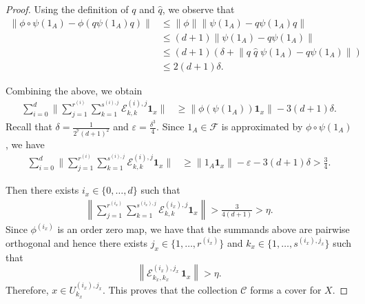\documentclass[a4paper]{amsart}
\numberwithin{equation}{section}
\newcommand{\Ecal}{\mathcal{E}}
\newcommand{\Fcal}{\mathcal{F}}
\newcommand{\e}{\varepsilon}
\newcommand{\indF}{\mathbf{1}}
\newcommand{\norm}[1]{{\left\lVert #1 \right \rVert}}
\newcommand{\normBig}[1]{{\Big\lVert #1 \Big \rVert}}
\newcommand{\unMatImg}[3]{{\Ecal_{#3}^{(#1), #2}}}
\theoremstyle{plain}
\theoremstyle{indented}
\numberwithin{equation}{section}
\theoremstyle{definition}
\theoremstyle{remark}
\theoremstyle{plain}
\theoremstyle{definition}
\begin{document}
\begin{proof}
       Using the definition of $q$ and $\widehat{q}$, we observe that
        \begin{align*}
            \norm{\phi \circ \psi (1_A) - \phi (q \psi (1_A) q) } 
           & \le \norm{\phi}\norm{ \psi (1_A) - q  \psi (1_A) q }  \\
           & \le (d+1) \norm{ \psi (1_A) - q  \psi (1_A)} \\
            & \le (d+1) ( \delta
            + \norm{ q \; \widehat{q}\;  \psi (1_A) - 
            q \psi (1_A)})  \\
            & \le 2(d+1) \delta.
        \end{align*}
         
        Combining the above, we obtain
        \begin{align*}
           \sum_{i=0}^d \Big\lVert \sum_{j =1 }^{r^{(i)}} \sum_{k =1 }^{s^{(i),j}}
             \unMatImg{i}{j}{k,k} \indF_x \Big\rVert
             & \ge  \normBig{ \phi \left( \psi(1_A) \right)\indF_x } - 3(d+1) \delta .
        \end{align*}
         Recall that 
         ${\delta = \frac{1}{2^7 (d+1)^2}}$ and  ${\e = \frac{\delta^3}{4}}$. 
         Since ${1_A\in \Fcal}$ is approximated by ${\phi \circ \psi (1_A)}$, we have
         \begin{align*}
           \sum_{i=0}^d \Big\lVert \sum_{j =1 }^{r^{(i)}} \sum_{k =1 }^{s^{(i),j}}
             \unMatImg{i}{j}{k,k} \indF_x \Big\rVert
             & \ge  \normBig{ 1_A\indF_x } - \e - 3(d+1) \delta  
              > \frac{3}{4}.
        \end{align*}
              
        Then there exists ${i_x \in \{0,\hdots,d\}}$ such that
        \begin{align*}
         \norm{ \sum_{j =1 }^{r^{(i_x)}} \sum_{k =1 }^{s^{(i_x),j}}
             \unMatImg{i_x}{j}{k,k} \indF_x }
             > \frac{3}{4(d+1)} > \eta.
        \end{align*}
        Since $\phi^{(i_x)}$ is an order zero map, we have that the summands above are pairwise orthogonal 
        and hence there exists ${j_x \in \{1,\hdots,r^{(i_x)}\}}$ and ${k_x \in \{1,\hdots,s^{(i_x),j_x}\}}$ such that
     \[{\norm{ \unMatImg{i_x}{j_x}{k_x,k_x} \, \indF_x }
             > \eta}.\]
    Therefore, ${x \in {U}_{k_x}^{(i_x),j_x}}$. This proves that the collection ${{\mathcal{C}}}$ forms a cover for $X$. \qedhere
     \end{proof}
\end{document}
